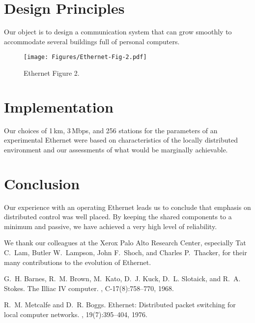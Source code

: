 \documentclass[sigconf]{acmart}
\begin{document}
\section{Design Principles}

Our object is to design a communication system that can grow smoothly
to accommodate several buildings full of personal computers.
\lipsum[2]

\begin{figure}[t]
  \centering
  \texttt{[image: Figures/Ethernet-Fig-2.pdf]}
  \caption{Ethernet Figure 2.}
  \label{fig:eth2}
\end{figure}

\lipsum[2]

\section{Implementation}

Our choices of 1\,km, 3\,Mbps, and 256 stations for the parameters of an
experimental Ethernet were based on characteristics of the locally distributed
environment and our assessments of what would be marginally achievable.
\lipsum[2]

\section{Conclusion}

Our experience with an operating Ethernet leads us to conclude that emphasis
on distributed control was well placed. By keeping the shared components
to a minimum and passive, we have achieved a very high level of reliability.
\lipsum[2]

\begin{acks}
We thank our colleagues at the Xerox Palo Alto Research Center,
especially Tat C.\ Lam, Butler W.\ Lampson, John F.\ Shoch, and
Charles P.\ Thacker, for their many contributions to the evolution
of Ethernet.
\end{acks}


\begin{thebibliography}{99}

G.~H. Barnes, R.~M. Brown, M.~Kato, D.~J. Kuck, D.~L. Slotaick,
  and R.~A. Stokes.
\newblock The Illiac IV computer.
, C-17(8):758--770, 1968.

R.~M. Metcalfe and D.~R. Boggs.
\newblock Ethernet: Distributed packet switching for local computer networks.
, 19(7):395--404, 1976.

\end{thebibliography}
\end{document}
